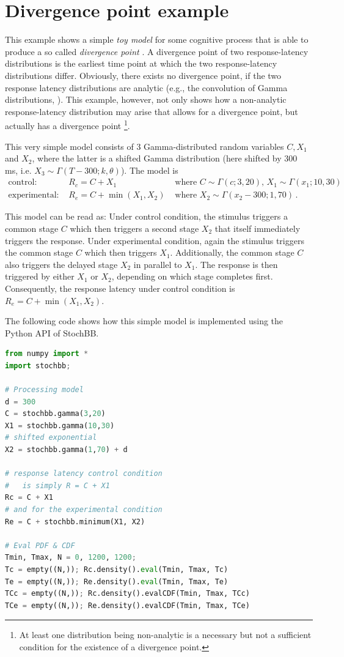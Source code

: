 \section{Divergence point example}
This example shows a simple \emph{toy model} for some cognitive process that is able to produce a
so called \emph{divergence point} \cite{Reingold2012}. A divergence point of two response-latency
distributions is the earliest time point at which the two response-latency distributions differ. Obviously, 
there exists no divergence point, if the two response latency distributions are analytic 
(e.g., the convolution of Gamma distributions, \cite{Gelooven1999}). This example, however,
not only shows how a non-analytic response-latency distribution may arise that allows for a 
divergence point, but actually has a divergence point%
\footnote{At least one distribution being non-analytic is a necessary but not a sufficient
condition for the existence of a divergence point.}. 

This very simple model consists of 3 Gamma-distributed random variables $C, X_1$ and $X_2$,
where the latter is a shifted Gamma distribution (here shifted by $300$ ms, i.e. 
$X_3 \sim \Gamma(T-300; k, \theta)$).  The model is
\begin{align}
 \text{control: } & R_c = C + X_1 & \text{ where } C \sim \Gamma(c; 3, 20),\,X_1\sim\Gamma(x_1; 10,30)\\
 \text{experimental: } & R_e = C + \min(X_1, X_2) & \text{ where } X_2 \sim\Gamma(x_2-300; 1, 70)\,.
\end{align}

This model can be read as: Under control condition, the stimulus triggers a common stage $C$ which then 
triggers a second stage $X_2$ that itself immediately triggers the response. Under experimental condition,
again the stimulus triggers the common stage $C$ which then triggers $X_1$. Additionally, the common
stage $C$ also triggers the delayed stage $X_2$ in parallel to $X_1$. The response is then triggered by 
either $X_1$ or $X_2$, depending on which stage completes first. Consequently, the response latency
under control condition is $R_e = C + \min(X_1,X_2)$.

The following code shows how this simple model is implemented using the Python API of StochBB.

\begin{lstlisting}[language=Python]
from numpy import *
import stochbb;

# Processing model
d = 300
C = stochbb.gamma(3,20)
X1 = stochbb.gamma(10,30)
# shifted exponential
X2 = stochbb.gamma(1,70) + d

# response latency control condition
#   is simply R = C + X1
Rc = C + X1
# and for the experimental condition
Re = C + stochbb.minimum(X1, X2)

# Eval PDF & CDF
Tmin, Tmax, N = 0, 1200, 1200;
Tc = empty((N,)); Rc.density().eval(Tmin, Tmax, Tc)
Te = empty((N,)); Re.density().eval(Tmin, Tmax, Te)
TCc = empty((N,)); Rc.density().evalCDF(Tmin, Tmax, TCc)
TCe = empty((N,)); Re.density().evalCDF(Tmin, Tmax, TCe)
\end{lstlisting}

